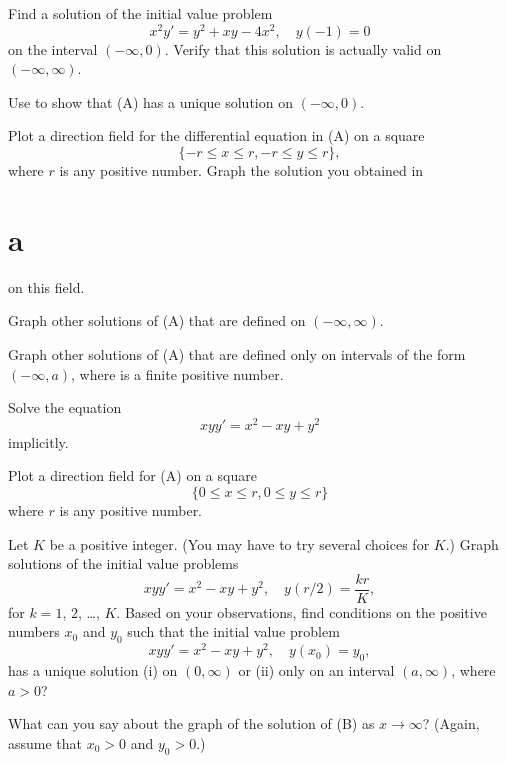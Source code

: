 \begin{exerciselist}

\item\label{exer:2.4.35}\Lex
\begin{alist}
\item %
Find a solution of the initial value problem
\[
x^2y'=y^2+xy-4x^2, \quad y(-1)=0\tag{A}
\]
on the interval $(-\infty,0)$. Verify that this solution is actually
valid on $(-\infty,\infty)$.
\item %
Use  to show that (A) has a
unique solution on $(-\infty,0)$.
\item %
Plot a direction field for the differential equation in
(A) on a square
\[
\{-r\le x\le r, -r\le y\le r\},
\]
where $r$
is any positive number. Graph the solution you obtained in
\part{a} on this field.
\item %
Graph  other solutions  of (A) that are defined on $(-\infty,\infty)$.
\item %
Graph other solutions of (A)  that are defined only on intervals of
the form $(-\infty,a)$, where is a finite positive number.
\end{alist}



\item\label{exer:2.4.36}\Lex
\begin{alist}
\item %
Solve the equation
\[
xyy'=x^2-xy+y^2\tag{A}
\]
implicitly.
\item %
Plot a direction field for (A) on a square
\[
\{0\le x\le r,0\le y\le r\}
\]
where $r$ is any positive number.
\item %
Let $K$ be a positive integer. (You may have to try several
choices for $K$.)
Graph solutions of the initial value problems
\[
xyy'=x^2-xy+y^2,\quad y(r/2)=\frac{kr}{K},
\]
for $k=1$, $2$, \dots, $K$. Based on your observations, find
 conditions on the positive numbers $x_0$
and $y_0$ such that the initial value problem
\[
xyy'=x^2-xy+y^2,\quad y(x_0)=y_0,\tag{B}
\]
has  a unique solution (i) on $(0,\infty)$   or (ii) only
on an interval  $(a,\infty)$, where $a>0$?
\item %
What can you say about the graph of the solution of (B)
as $x\to\infty$? (Again, assume that $x_0>0$ and $y_0>0$.)
\end{alist}



\end{exerciselist}
